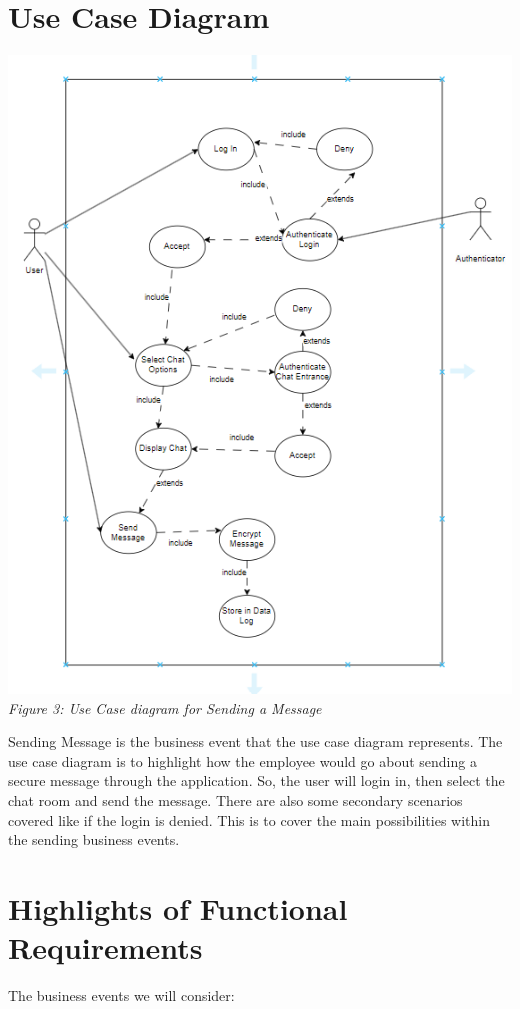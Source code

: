 \documentclass[]{article}
\begin{document}
\section{Use Case Diagram}
\label{sec:use_case_diagram}
\begin{center}
    \includegraphics{Graphics/usecaseBetter.png}\\
    \emph{Figure 3: Use Case diagram for Sending a Message}
\end{center}

\hspace{5mm}Sending Message is the business event that the use case diagram represents. The use case diagram is to highlight how the employee would go about sending a secure message through the application. So, the user will login in, then select the chat room and send the message. There are also some secondary scenarios covered like if the login is denied. This is to cover the main possibilities within the sending business events.

\section{Highlights of Functional Requirements}
\label{sec:functional_requirements}
The business events we will consider:
\end{document}
